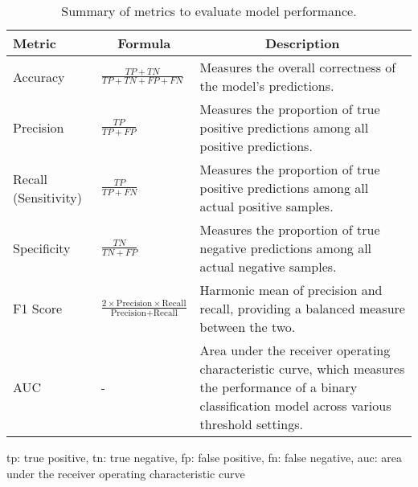\begin{table}[ht]
  \begin{threeparttable}
    \captionsetup{justification=raggedright,singlelinecheck=false}
    \caption[Summary of metrics to evaluate model performance]{Summary of metrics to evaluate model performance.}
    \label{tab:metrics-summary}
    \renewcommand{\arraystretch}{1.25}
    \begin{tabular}{@{}p{3.5cm}p{4cm}p{6.5cm}@{}}
        \toprule
        \textbf{Metric} & \multicolumn{1}{c}{\textbf{Formula}} & \multicolumn{1}{c}{\textbf{Description}}\\ 
        \midrule
            Accuracy & \centering$\displaystyle\frac{TP + TN}{TP + TN + FP + FN}$ & Measures the overall correctness of the model's predictions.\\
            Precision & \centering$\displaystyle\frac{TP}{TP + FP}$ & Measures the proportion of true positive predictions among all positive predictions.\\
            Recall (Sensitivity) & \centering$\displaystyle\frac{TP}{TP + FN}$ & Measures the proportion of true positive predictions among all actual positive samples.\\
            Specificity & \centering$\displaystyle\frac{TN}{TN + FP}$  & Measures the proportion of true negative predictions among all actual negative samples.\\
            F1 Score & \centering$\displaystyle\frac{2 \times \text{Precision} \times \text{Recall}}{\text{Precision} + \text{Recall}}$  &  Harmonic mean of precision and recall, providing a balanced measure between the two.\\
            AUC & \centering- & Area under the receiver operating characteristic curve, which measures the performance of a binary classification model across various threshold settings. \\
        \bottomrule
    \end{tabular}
    \begin{tablenotes}
    \small
    \item \gls{tp}: true positive, \gls{tn}: true negative, \gls{fp}: false positive, \gls{fn}: false negative, \gls{auc}: area under the receiver operating characteristic curve
    \end{tablenotes}
\end{threeparttable}
\end{table}

